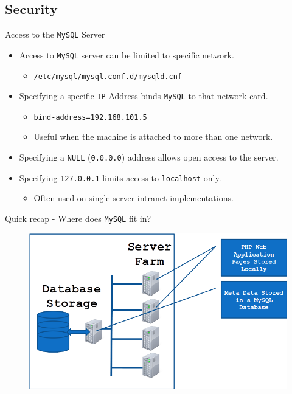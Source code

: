 \documentclass[xcolor=table,aspectratio=169]{beamer}
\begin{document}
\subsection{Security}
\begin{frame}{Access to the \texttt{MySQL} Server}
  \begin{itemize}
    \item Access to \texttt{MySQL} server can be limited to specific network.
      \begin{itemize}
        \item \texttt{/etc/mysql/mysql.conf.d/mysqld.cnf}
      \end{itemize}
    \item Specifying a specific \texttt{IP} Address binds \texttt{MySQL} to that network card.
      \begin{itemize}
        \item \texttt{bind-address=192.168.101.5}
        \item Useful when the machine is attached to more than one network.
      \end{itemize}
    \item Specifying a \texttt{NULL} (\texttt{0.0.0.0}) address allows open access to the server.
    \item Specifying \texttt{127.0.0.1} limits access to \texttt{localhost} only.
      \begin{itemize}
        \item Often used on single server intranet implementations.
      \end{itemize}
  \end{itemize}
\end{frame}

\begin{frame}{Quick recap - Where does \texttt{MySQL} fit in?}
  \begin{figure}
    \begin{center}
      \includegraphics[width=0.7\linewidth]{MySQLWhere.png}
    \end{center}
  \end{figure}
\end{frame}
\end{document}
